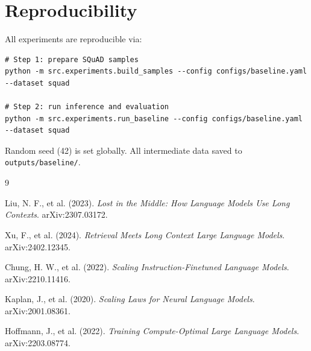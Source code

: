 \documentclass[11pt,a4paper]{article}
\begin{document}
\section{Reproducibility}

All experiments are reproducible via:

\begin{lstlisting}[caption=Reproduction commands, label=lst:reproduce, basicstyle=\ttfamily\footnotesize]
# Step 1: prepare SQuAD samples
python -m src.experiments.build_samples --config configs/baseline.yaml --dataset squad

# Step 2: run inference and evaluation
python -m src.experiments.run_baseline --config configs/baseline.yaml --dataset squad
\end{lstlisting}

Random seed (42) is set globally. All intermediate data saved to \texttt{outputs/baseline/}. 

\begin{thebibliography}{9}

Liu, N. F., et al. (2023).
\textit{Lost in the Middle: How Language Models Use Long Contexts}.
arXiv:2307.03172.

Xu, F., et al. (2024).
\textit{Retrieval Meets Long Context Large Language Models}.
arXiv:2402.12345.

Chung, H. W., et al. (2022).
\textit{Scaling Instruction-Finetuned Language Models}.
arXiv:2210.11416.

Kaplan, J., et al. (2020).
\textit{Scaling Laws for Neural Language Models}.
arXiv:2001.08361.

Hoffmann, J., et al. (2022).
\textit{Training Compute-Optimal Large Language Models}.
arXiv:2203.08774.

\end{thebibliography}
\end{document}
